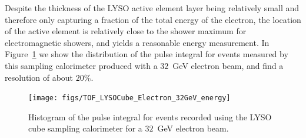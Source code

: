 \documentclass[11pt]{article}
\begin{document}
Despite the thickness of the LYSO active element layer being relatively
small and therefore only capturing a fraction of the total energy
of the electron, the location of the active element is relatively close to the
shower maximum for electromagnetic showers, and yields
a reasonable energy measurement. In Figure~\ref{fig:LYSOCubeEnergy32GeV}
we show the distribution of the pulse integral for events
measured by this sampling calorimeter produced with a
$32$~GeV electron beam, and find a resolution of about $20\%$.


\begin{figure}[h] \centering
\texttt{[image: figs/TOF\_LYSOCube\_Electron\_32GeV\_energy]} 
\caption{ Histogram of the pulse integral for events recorded using
the LYSO cube sampling calorimeter for a $32$~GeV electron beam. } 
\label{fig:LYSOCubeEnergy32GeV}
\end{figure}
\end{document}
